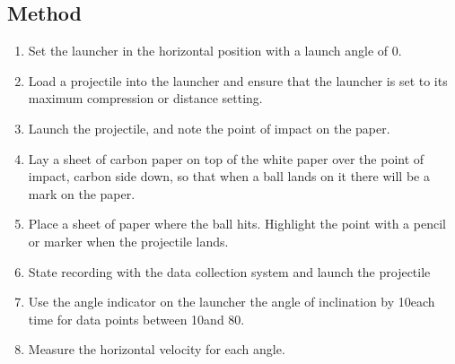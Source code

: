 	\subsection{Method}
		\begin{enumerate}
			\item Set the launcher in the horizontal position with a launch angle of 0\textdegree.
			\item Load a projectile into the launcher and ensure that the launcher is set to its maximum compression or distance setting.
			\item Launch the projectile, and note the point of impact on the paper.
			\item Lay a sheet of carbon paper on top of the white paper over the point of impact, carbon side down, so that when a ball lands on it there will be a mark on the paper.
			\item Place a sheet of paper where the ball hits. Highlight the point with a pencil or marker when the projectile lands.
			\item State recording with the data collection system and launch the projectile
			\item Use the angle indicator on the launcher the angle of inclination by 10\textdegree each time for data points between 10\textdegree and 80\textdegree.
			\item Measure the horizontal velocity for each angle.
		\end{enumerate}

